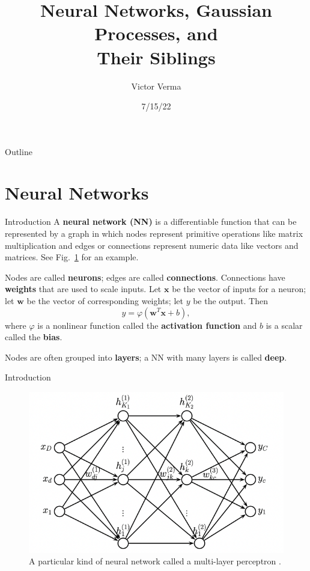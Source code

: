 \documentclass{beamer}
\title[NNs, GPs, and Their Siblings]{
Neural Networks, Gaussian Processes, and \\
Their Siblings
}
\author[Victor Verma]{Victor Verma}
\institute[]{Hot Ideas in Machine Learning Reading Group, University of Michigan}
\date{7/15/22}
\begin{document}
\begin{frame}
  \titlepage
\end{frame}

\begin{frame}{Outline}
    \tableofcontents
\end{frame}

\section{Neural Networks}

\begin{frame}{Introduction}
    A \textbf{neural network (NN)} is a differentiable function that can be represented by a graph in which nodes represent primitive operations like matrix multiplication and edges or connections represent numeric data like vectors and matrices. See Fig.~\ref{fig:mlp} for an example.
    
    \medskip
    
    Nodes are called \textbf{neurons}; edges are called \textbf{connections}. Connections have \textbf{weights} that are used to scale inputs. Let $\boldsymbol{x}$ be the vector of inputs for a neuron; let $\boldsymbol{w}$ be the vector of corresponding weights; let $y$ be the output. Then
    \[
    y = \varphi(\boldsymbol{w}^T \boldsymbol{x} + b),
    \]
    where $\varphi$ is a nonlinear function called the \textbf{activation function} and $b$ is a scalar called the \textbf{bias}.
    
    \medskip
    
    Nodes are often grouped into \textbf{layers}; a NN with many layers is called \textbf{deep}.
\end{frame}

\begin{frame}{Introduction}
    \begin{figure}
        \centering
        \includegraphics[scale=0.8]{mlp.png}
        \caption{A particular kind of neural network called a multi-layer perceptron \cite{pml2Book}.}
        \label{fig:mlp}
    \end{figure}    
\end{frame}
\end{document}
